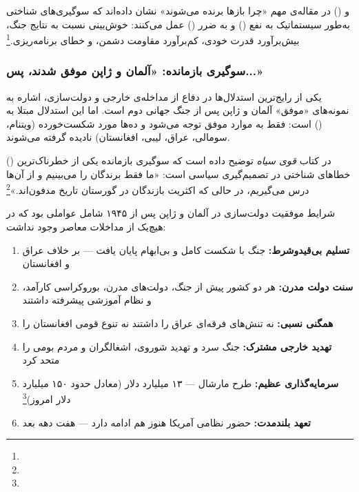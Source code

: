  و  () در مقاله‌ی مهم «چرا بازها برنده می‌شوند» نشان داده‌اند که سوگیری‌های شناختی به‌طور سیستماتیک به نفع  () و به ضرر  () عمل می‌کنند: خوش‌بینی نسبت به نتایج جنگ، بیش‌برآورد قدرت خودی، کم‌برآورد مقاومت دشمن، و خطای برنامه‌ریزی.\footnote{}

\subsubsection{سوگیری بازمانده: «آلمان و ژاپن موفق شدند، پس...»}
\label{subsubsec:ch11-survivorship}

یکی از رایج‌ترین استدلال‌ها در دفاع از مداخله‌ی خارجی و دولت‌سازی، اشاره به نمونه‌های «موفق» آلمان و ژاپن پس از جنگ جهانی دوم است. اما این استدلال مبتلا به  () است: فقط به موارد موفق توجه می‌شود و ده‌ها مورد شکست‌خورده (ویتنام، سومالی، عراق، لیبی، افغانستان) نادیده گرفته می‌شوند.

 () در کتاب \textit{قوی سیاه} توضیح داده است که سوگیری بازمانده یکی از خطرناک‌ترین خطاهای شناختی در تصمیم‌گیری سیاسی است: «ما فقط برندگان را می‌بینیم و از آن‌ها درس می‌گیریم، در حالی که اکثریت بازندگان در گورستان تاریخ مدفون‌اند.»\footnote{}

\begin{tcolorbox}[wavebox, title={تحلیل: چرا آلمان و ژاپن استثنا بودند، نه قاعده}]
شرایط موفقیت دولت‌سازی در آلمان و ژاپن پس از ۱۹۴۵ شامل عواملی بود که در هیچ‌یک از مداخلات معاصر وجود نداشت:
\begin{enumerate}
\item \textbf{تسلیم بی‌قیدوشرط:} جنگ با شکست کامل و بی‌ابهام پایان یافت — بر خلاف عراق و افغانستان
\item \textbf{سنت دولت مدرن:} هر دو کشور پیش از جنگ، دولت‌های مدرن، بوروکراسی کارآمد، و نظام آموزشی پیشرفته داشتند
\item \textbf{همگنی نسبی:} نه تنش‌های فرقه‌ای عراق را داشتند نه تنوع قومی افغانستان را
\item \textbf{تهدید خارجی مشترک:} جنگ سرد و تهدید شوروی، اشغالگران و مردم بومی را متحد کرد
\item \textbf{سرمایه‌گذاری عظیم:} طرح مارشال — ۱۳ میلیارد دلار (معادل حدود ۱۵۰ میلیارد دلار امروز)\footnote{}
\item \textbf{تعهد بلندمدت:} حضور نظامی آمریکا هنوز هم ادامه دارد — هفت دهه بعد
\end{enumerate}
\end{tcolorbox}



